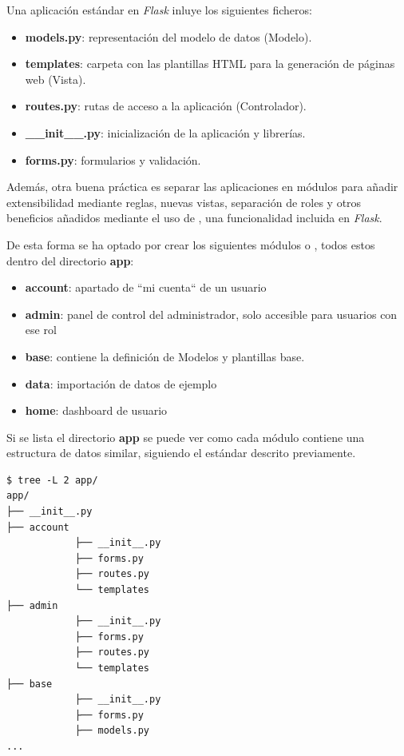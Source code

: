\documentclass[11pt,spanish,listoffigures,listoftables]{tfgetsinf}
\begin{document}
Una aplicación estándar en \textit{Flask} inluye los siguientes ficheros:

\begin{itemize}
	\item \textbf{models.py}: representación del modelo de datos (Modelo).
	\item \textbf{templates}: carpeta con las plantillas HTML para la generación de páginas web (Vista).
	\item \textbf{routes.py}: rutas de acceso a la aplicación (Controlador).
	\item \textbf{\_\_init\_\_.py}: inicialización de la aplicación y librerías.
	\item \textbf{forms.py}: formularios y validación.
\end{itemize}

Además, otra buena práctica es separar las aplicaciones en módulos para añadir extensibilidad mediante reglas, nuevas vistas, separación de roles y otros beneficios añadidos mediante el uso de  \cite{book-mastering-flask}, una funcionalidad incluida en \textit{Flask}.

De esta forma se ha optado por crear los siguientes módulos o , todos estos dentro del directorio \textbf{app}:

\begin{itemize}
	\item \textbf{account}: apartado de ``mi cuenta`` de un usuario
	\item \textbf{admin}: panel de control del administrador, solo accesible para usuarios con ese rol
	\item \textbf{base}: contiene la definición de Modelos y plantillas base.
	\item \textbf{data}: importación de datos de ejemplo
	\item \textbf{home}: \foreignlanguage{english}{dashboard} de usuario
\end{itemize}

Si se lista el directorio \textbf{app} se puede ver como cada módulo contiene una estructura de datos similar, siguiendo el estándar descrito previamente.

\begin{lstlisting}[style=ascii-tree]
$ tree -L 2 app/
app/
├── __init__.py
├── account
			├── __init__.py
			├── forms.py
			├── routes.py
			└── templates
├── admin
			├── __init__.py
			├── forms.py
			├── routes.py
			└── templates
├── base
			├── __init__.py
			├── forms.py
			├── models.py
...
\end{lstlisting}
\end{document}
